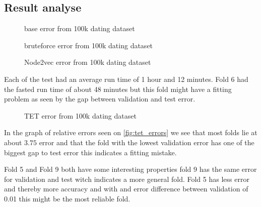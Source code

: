 \subsection{Result analyse}

\begin{figure}[H]
	\centering
	\begin{adjustbox}{width=0.5\textwidth}
		
	\end{adjustbox}
	\caption{base error from 100k dating dataset }
	\label{fig:base_errors}
\end{figure}

\begin{figure}[H]
	\centering
	\begin{adjustbox}{width=0.5\textwidth}
		
	\end{adjustbox}
	\caption{bruteforce error from 100k dating dataset }
	\label{fig:brute_errors}
\end{figure}

\begin{figure}[H]
	\centering
	\begin{adjustbox}{width=0.5\textwidth}
		
	\end{adjustbox}
	\caption{Node2vec error from 100k dating dataset }
	\label{fig:N2V_errors}
\end{figure}


Each of the test had an average run time of 1 hour and 12 minutes.  Fold 6 had the fasted run time of about 48 minutes but this fold might have a fitting problem as seen by the gap between validation and test error.

\begin{figure}[H]
	\centering
	\begin{adjustbox}{width=0.5\textwidth}
		
	\end{adjustbox}
	\caption{TET error from 100k dating dataset }
	\label{fig:tet_errors}
\end{figure}

In the graph of relative errors seen on \autoref{fig:tet_errors} we see that most folds lie at about $3.75$ error and that the fold with the lowest validation error has one of the biggest gap to test error this indicates a fitting mistake. 

Fold 5 and Fold 9 both have some interesting properties fold 9 has the same error for validation and test witch indicates a more general fold. Fold 5 has less error and thereby more accuracy and with and error difference between validation of 0.01 this might be the most reliable fold.


%		
